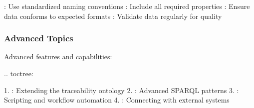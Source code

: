 \documentclass[letterpaper,10pt,english]{sphinxmanual}
\begin{document}
\sphinxAtStartPar
{}
\sphinxhyphen{} : Use standardized naming conventions
\sphinxhyphen{} : Include all required properties
\sphinxhyphen{} : Ensure data conforms to expected formats
\sphinxhyphen{} : Validate data regularly for quality


\subsubsection{Advanced Topics}
\label{\detokenize{user-guide/index:advanced-topics}}
\sphinxAtStartPar
Advanced features and capabilities:

\sphinxAtStartPar
{}
.. toctree:

\begin{sphinxVerbatim}[commandchars=\\\{\}]
 
  

\end{sphinxVerbatim}

\sphinxAtStartPar
{}
1. : Extending the traceability ontology
2. : Advanced SPARQL patterns
3. : Scripting and workflow automation
4. : Connecting with external systems
\end{document}
